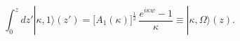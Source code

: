 \begin{equation}
\int_0^z dz' |\kappa,1\rangle(z')=\bigl[A_1(\kappa)\bigr]^{\frac12}\,
\frac{e^{i\kappa w}-1}{\kappa}
\equiv |\kappa,\Omega\rangle(z).
\label{kappaO}
\end{equation}

